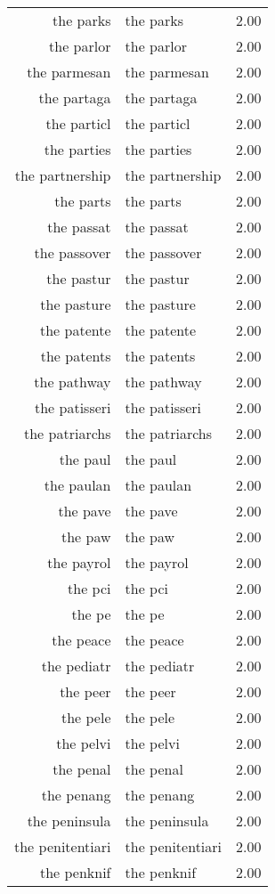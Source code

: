 \begin{table}[ht]
\begin{tabular}{rlr}
  the parks & the parks & 2.00 \\ 
  the parlor & the parlor & 2.00 \\ 
  the parmesan & the parmesan & 2.00 \\ 
  the partaga & the partaga & 2.00 \\ 
  the particl & the particl & 2.00 \\ 
  the parties & the parties & 2.00 \\ 
  the partnership & the partnership & 2.00 \\ 
  the parts & the parts & 2.00 \\ 
  the passat & the passat & 2.00 \\ 
  the passover & the passover & 2.00 \\ 
  the pastur & the pastur & 2.00 \\ 
  the pasture & the pasture & 2.00 \\ 
  the patente & the patente & 2.00 \\ 
  the patents & the patents & 2.00 \\ 
  the pathway & the pathway & 2.00 \\ 
  the patisseri & the patisseri & 2.00 \\ 
  the patriarchs & the patriarchs & 2.00 \\ 
  the paul & the paul & 2.00 \\ 
  the paulan & the paulan & 2.00 \\ 
  the pave & the pave & 2.00 \\ 
  the paw & the paw & 2.00 \\ 
  the payrol & the payrol & 2.00 \\ 
  the pci & the pci & 2.00 \\ 
  the pe & the pe & 2.00 \\ 
  the peace & the peace & 2.00 \\ 
  the pediatr & the pediatr & 2.00 \\ 
  the peer & the peer & 2.00 \\ 
  the pele & the pele & 2.00 \\ 
  the pelvi & the pelvi & 2.00 \\ 
  the penal & the penal & 2.00 \\ 
  the penang & the penang & 2.00 \\ 
  the peninsula & the peninsula & 2.00 \\ 
  the penitentiari & the penitentiari & 2.00 \\ 
  the penknif & the penknif & 2.00 \\ 

\end{tabular}
\end{table}
